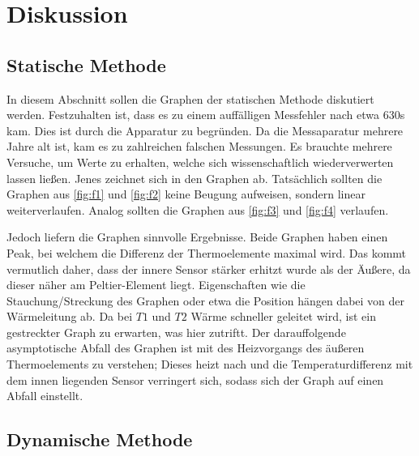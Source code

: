 \section{Diskussion}
\label{sec:Diskussion}

\subsection{Statische Methode}
In diesem Abschnitt sollen die Graphen der statischen Methode diskutiert werden.
Festzuhalten ist, dass es zu einem auffälligen Messfehler nach etwa 630s kam.
Dies ist durch die Apparatur zu begründen. Da die Messaparatur mehrere Jahre 
alt ist, kam es zu zahlreichen falschen Messungen. Es brauchte mehrere Versuche, 
um Werte zu erhalten, welche sich wissenschaftlich wiederverwerten lassen ließen.
Jenes zeichnet sich in den Graphen ab. Tatsächlich sollten die Graphen aus 
\autoref{fig:f1} und \autoref{fig:f2} keine Beugung aufweisen, sondern linear 
weiterverlaufen. Analog sollten die Graphen aus \autoref{fig:f3} und \autoref{fig:f4}
verlaufen.
\par\vspace{0.5em}
\noindent Jedoch liefern die Graphen sinnvolle Ergebnisse. Beide Graphen 
haben einen Peak, bei welchem die Differenz der Thermoelemente maximal wird.
Das kommt vermutlich daher, dass der innere Sensor stärker erhitzt wurde als 
der Äußere, da dieser näher am Peltier-Element liegt. Eigenschaften wie die 
Stauchung/Streckung des Graphen oder etwa die Position hängen dabei von der 
Wärmeleitung ab. Da bei $T1$ und $T2$ Wärme schneller geleitet wird, ist ein 
gestreckter Graph zu erwarten, was hier zutriftt. Der darauffolgende asymptotische 
Abfall des Graphen ist mit des Heizvorgangs des äußeren Thermoelements zu verstehen;
Dieses heizt nach und die Temperaturdifferenz mit dem innen liegenden Sensor 
verringert sich, sodass sich der Graph auf einen Abfall einstellt.

\subsection{Dynamische Methode}
